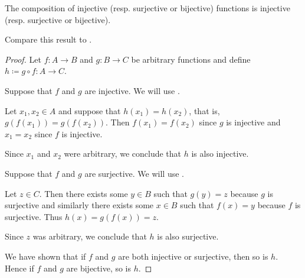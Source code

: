 \begin{proposition}\label{thm:function_composition_invertibility}
  The composition of injective (resp. surjective or bijective) functions is injective (resp. surjective or bijective).

  Compare this result to .
\end{proposition}
\begin{proof}
  Let \( f: A \to B \) and \( g: B \to C \) be arbitrary functions and define \( h \coloneqq g \circ f: A \to C \).

   Suppose that \( f \) and \( g \) are injective. We will use .

  Let \( x_1, x_2 \in A \) and suppose that \( h(x_1) = h(x_2) \), that is, \( g(f(x_1)) = g(f(x_2)) \). Then \( f(x_1) = f(x_2) \) since \( g \) is injective and \( x_1 = x_2 \) since \( f \) is injective.

  Since \( x_1 \) and \( x_2 \) were arbitrary, we conclude that \( h \) is also injective.

   Suppose that \( f \) and \( g \) are surjective. We will use .

  Let \( z \in C \). Then there exists some \( y \in B \) such that \( g(y) = z \) because \( g \) is surjective and similarly there exists some \( x \in B \) such that \( f(x) = y \) because \( f \) is surjective. Thus \( h(x) = g(f(x)) = z \).

  Since \( z \) was arbitrary, we conclude that \( h \) is also surjective.

   We have shown that if \( f \) and \( g \) are both injective or surjective, then so is \( h \). Hence if \( f \) and \( g \) are bijective, so is \( h \).
\end{proof}


